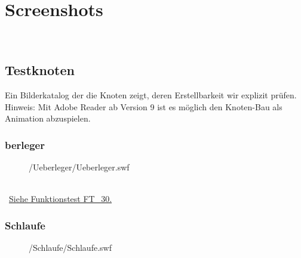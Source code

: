 %



\section{Screenshots}
\label{Anhang:Aufnahmen}


~\\



\newpage




\subsection{Testknoten}

Ein Bilderkatalog der die Knoten zeigt, deren Erstellbarkeit wir explizit prüfen. Hinweis: Mit Adobe Reader ab Version 9 ist es möglich den Knoten-Bau als Animation abzuspielen.\\


	\subsubsection*{berleger\grqq}
	
	
		\begin{figure}[!h]
		
			\label{Abb:Test-Knoten:Ueberleger}
			\centering	
			
			{\testknots/Ueberleger/Ueberleger.swf}
			
		\end{figure}
		
		~\\\mousecursor~\hyperref[FT:30:Ueberleger]{Siehe Funktionstest FT\_30.} 
	
	
\clearpage	


	\subsubsection*{\glqq Schlaufe\grqq}	
	
		\begin{figure}[!h]
		
			\label{Abb:Test-Knoten:Schlaufe}
			\centering	
			
			{\testknots/Schlaufe/Schlaufe.swf}
			
		\end{figure}
		

